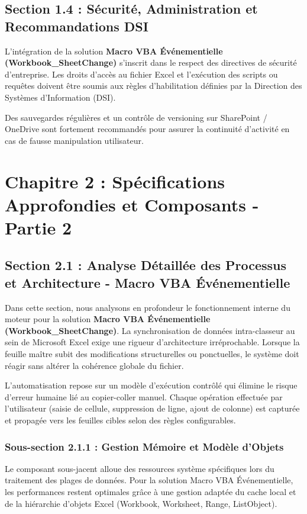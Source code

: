 \documentclass[12pt,a4paper]{report}
\begin{document}
\section{Section 1.4 : Sécurité, Administration et Recommandations DSI}
L'intégration de la solution \textbf{Macro VBA Événementielle (Workbook\_SheetChange)} s'inscrit dans le respect des directives de sécurité d'entreprise. Les droits d'accès au fichier Excel et l'exécution des scripts ou requêtes doivent être soumis aux règles d'habilitation définies par la Direction des Systèmes d'Information (DSI).

Des sauvegardes régulières et un contrôle de versioning sur SharePoint / OneDrive sont fortement recommandés pour assurer la continuité d'activité en cas de fausse manipulation utilisateur.


\chapter{Chapitre 2 : Spécifications Approfondies et Composants - Partie 2}

\section{Section 2.1 : Analyse Détaillée des Processus et Architecture - Macro VBA Événementielle}
Dans cette section, nous analysons en profondeur le fonctionnement interne du moteur pour la solution \textbf{Macro VBA Événementielle (Workbook\_SheetChange)}. La synchronisation de données intra-classeur au sein de Microsoft Excel exige une rigueur d'architecture irréprochable. Lorsque la feuille maître subit des modifications structurelles ou ponctuelles, le système doit réagir sans altérer la cohérence globale du fichier.

L'automatisation repose sur un modèle d'exécution contrôlé qui élimine le risque d'erreur humaine lié au copier-coller manuel. Chaque opération effectuée par l'utilisateur (saisie de cellule, suppression de ligne, ajout de colonne) est capturée et propagée vers les feuilles cibles selon des règles configurables.


\subsection{Sous-section 2.1.1 : Gestion Mémoire et Modèle d'Objets}
Le composant sous-jacent alloue des ressources système spécifiques lors du traitement des plages de données. Pour la solution Macro VBA Événementielle, les performances restent optimales grâce à une gestion adaptée du cache local et de la hiérarchie d'objets Excel (Workbook, Worksheet, Range, ListObject).
\end{document}
